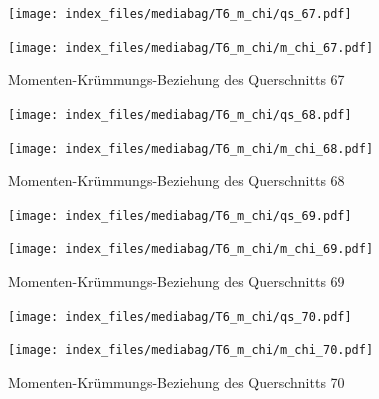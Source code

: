 \documentclass[
  11pt,
  letterpaper,
]{scrreprt}
\begin{document}
\begin{figure}[H]

\begin{minipage}{0.50\linewidth}
\texttt{[image: index\_files/mediabag/T6\_m\_chi/qs\_67.pdf]}\end{minipage}%
%
\begin{minipage}{0.50\linewidth}
\texttt{[image: index\_files/mediabag/T6\_m\_chi/m\_chi\_67.pdf]}\end{minipage}%

\caption{\label{fig-m_chi_appendix}Momenten-Krümmungs-Beziehung des
Querschnitts 67}

\end{figure}%

\begin{figure}[H]

\begin{minipage}{0.50\linewidth}
\texttt{[image: index\_files/mediabag/T6\_m\_chi/qs\_68.pdf]}\end{minipage}%
%
\begin{minipage}{0.50\linewidth}
\texttt{[image: index\_files/mediabag/T6\_m\_chi/m\_chi\_68.pdf]}\end{minipage}%

\caption{\label{fig-m_chi_appendix}Momenten-Krümmungs-Beziehung des
Querschnitts 68}

\end{figure}%

\begin{figure}[H]

\begin{minipage}{0.50\linewidth}
\texttt{[image: index\_files/mediabag/T6\_m\_chi/qs\_69.pdf]}\end{minipage}%
%
\begin{minipage}{0.50\linewidth}
\texttt{[image: index\_files/mediabag/T6\_m\_chi/m\_chi\_69.pdf]}\end{minipage}%

\caption{\label{fig-m_chi_appendix}Momenten-Krümmungs-Beziehung des
Querschnitts 69}

\end{figure}%

\begin{figure}[H]

\begin{minipage}{0.50\linewidth}
\texttt{[image: index\_files/mediabag/T6\_m\_chi/qs\_70.pdf]}\end{minipage}%
%
\begin{minipage}{0.50\linewidth}
\texttt{[image: index\_files/mediabag/T6\_m\_chi/m\_chi\_70.pdf]}\end{minipage}%

\caption{\label{fig-m_chi_appendix}Momenten-Krümmungs-Beziehung des
Querschnitts 70}

\end{figure}%
\end{document}
